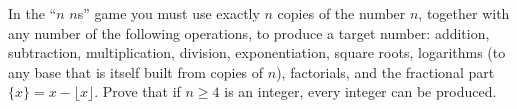 In the ``$n$ $n$s'' game you must use exactly $n$ copies of the number $n$, together with any number of the following operations, to produce a target number: addition, subtraction, multiplication, division, exponentiation, square roots, logarithms (to any base that is itself built from copies of $n$), factorials, and the fractional part $\{x\}=x-\lfloor x\rfloor$. Prove that if $n\ge4$ is an integer, every integer can be produced.
